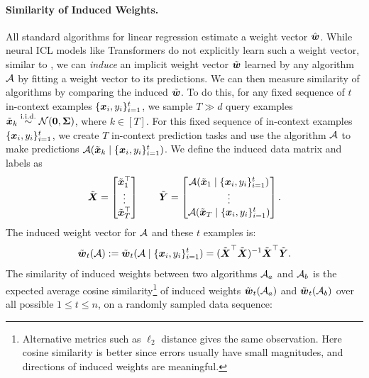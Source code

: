 \paragraph{Similarity of Induced Weights.}
All standard algorithms for linear regression estimate a weight vector $\hat{\boldsymbol{w}}$. 
While neural ICL models like Transformers do not explicitly learn such a weight vector, similar to \citet{Akyrek2022WhatLA},
we can \emph{induce} an implicit weight vector $\tilde{\boldsymbol{w}}$ learned by any algorithm ${\mathcal{A}}$ by fitting a weight vector to its predictions.
We can then measure similarity of algorithms by comparing the induced $\tilde{\boldsymbol{w}}$.
To do this, for any fixed sequence of $t$ in-context examples  $\{\boldsymbol{x}_i, y_i\}_{i=1}^{t}$, we sample $T\gg d$ query examples  $\tilde{\boldsymbol{x}}_{k} \overset{\text{i.i.d.}}{\sim} \mathcal N(\boldsymbol{0}, \boldsymbol{\Sigma})$, where $k\in [T]$. For this fixed sequence of in-context examples $\{\boldsymbol{x}_i, y_i\}_{i=1}^{t}$, we create $T$ in-context prediction tasks and use the algorithm ${\mathcal{A}}$ to make predictions ${\mathcal{A}}(\tilde{\boldsymbol{x}}_k \mid \{\boldsymbol{x}_i, y_i\}_{i=1}^{t})$. We define the induced data matrix and labels as 
\begin{equation}
    \tilde{\boldsymbol{X}} = \begin{bmatrix}
        \tilde{\boldsymbol{x}}_1^\top \\  \vdots \\ \tilde{\boldsymbol{x}}_T^\top
    \end{bmatrix}  \qquad \tilde{\boldsymbol{Y}} = \begin{bmatrix}
        {\mathcal{A}}(\tilde{\boldsymbol{x}}_1 \mid \{\boldsymbol{x}_i, y_i\}_{i=1}^{t}) \\ 
        \vdots \\ 
        {\mathcal{A}}(\tilde{\boldsymbol{x}}_T \mid \{\boldsymbol{x}_i, y_i\}_{i=1}^{t})
    \end{bmatrix}.
\end{equation}
The induced weight vector for ${\mathcal{A}}$ and these $t$ examples is:
\begin{equation}
    \tilde{\boldsymbol{w}}_t({\mathcal{A}}) := \tilde{\boldsymbol{w}}_t({\mathcal{A}} \mid \{\boldsymbol{x}_i, y_i\}_{i=1}^t) = (\tilde{\boldsymbol{X}}^\top \tilde{\boldsymbol{X}})^{-1} \tilde{\boldsymbol{X}}^\top \tilde{\boldsymbol{Y}}.
\end{equation}
The similarity of induced weights between two algorithms ${\mathcal{A}}_a$ and ${\mathcal{A}}_b$ is the expected average cosine similarity\footnote{Alternative metrics such as $\ell_2$ distance gives the same observation. Here cosine similarity is better since errors usually have small magnitudes, and directions of induced weights are meaningful.} of induced weights $\tilde{\boldsymbol{w}}_t({\mathcal{A}}_a)$ and $\tilde{\boldsymbol{w}}_t({\mathcal{A}}_b)$ over all possible $1 \leq t \leq n$, on a randomly sampled data sequence:
